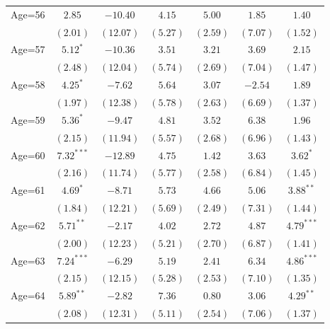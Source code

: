 \documentclass[fullpage]{paper}
\begin{document}
\begin{center}
\begin{longtable}{l c c c c c c }
Age=56      & $2.85$        & $-10.40$     & $4.15$        & $5.00$       & $1.85$        & $1.40$        \\
            & $(2.01)$      & $(12.07)$    & $(5.27)$      & $(2.59)$     & $(7.07)$      & $(1.52)$      \\
Age=57      & $5.12^{*}$    & $-10.36$     & $3.51$        & $3.21$       & $3.69$        & $2.15$        \\
            & $(2.48)$      & $(12.04)$    & $(5.74)$      & $(2.69)$     & $(7.04)$      & $(1.47)$      \\
Age=58      & $4.25^{*}$    & $-7.62$      & $5.64$        & $3.07$       & $-2.54$       & $1.89$        \\
            & $(1.97)$      & $(12.38)$    & $(5.78)$      & $(2.63)$     & $(6.69)$      & $(1.37)$      \\
Age=59      & $5.36^{*}$    & $-9.47$      & $4.81$        & $3.52$       & $6.38$        & $1.96$        \\
            & $(2.15)$      & $(11.94)$    & $(5.57)$      & $(2.68)$     & $(6.96)$      & $(1.43)$      \\
Age=60      & $7.32^{***}$  & $-12.89$     & $4.75$        & $1.42$       & $3.63$        & $3.62^{*}$    \\
            & $(2.16)$      & $(11.74)$    & $(5.77)$      & $(2.58)$     & $(6.84)$      & $(1.45)$      \\
Age=61      & $4.69^{*}$    & $-8.71$      & $5.73$        & $4.66$       & $5.06$        & $3.88^{**}$   \\
            & $(1.84)$      & $(12.21)$    & $(5.69)$      & $(2.49)$     & $(7.31)$      & $(1.44)$      \\
Age=62      & $5.71^{**}$   & $-2.17$      & $4.02$        & $2.72$       & $4.87$        & $4.79^{***}$  \\
            & $(2.00)$      & $(12.23)$    & $(5.21)$      & $(2.70)$     & $(6.87)$      & $(1.41)$      \\
Age=63      & $7.24^{***}$  & $-6.29$      & $5.19$        & $2.41$       & $6.34$        & $4.86^{***}$  \\
            & $(2.15)$      & $(12.15)$    & $(5.28)$      & $(2.53)$     & $(7.10)$      & $(1.35)$      \\
Age=64      & $5.89^{**}$   & $-2.82$      & $7.36$        & $0.80$       & $3.06$        & $4.29^{**}$   \\
            & $(2.08)$      & $(12.31)$    & $(5.11)$      & $(2.54)$     & $(7.06)$      & $(1.37)$      \\

\end{longtable}
\end{center}
\end{document}
